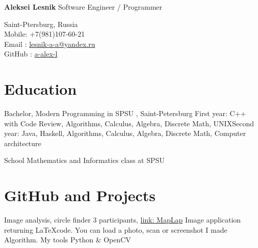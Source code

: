\documentclass[12pt,a4paper]{moderncv}
\begin{document}

	\begin{minipage} {0.7\textwidth}
		\begin{flushleft}
			\huge \textbf{Aleksei Lesnik} 
			\newline
			\textcolor[gray]{0.4} {
			    \indent Software Engineer / Programmer\\
			}
			\normalsize
		\end{flushleft}
	\end{minipage}
	\begin{minipage} {0.3\textwidth}
		\begin{flushright}
			\textcolor[gray]{0.4} {
				\indent Saint-Ptersburg, Russia\\
				\indent Mobile: +7(981)107-60-21  \\
				\indent Email : \textcolor{blue} {\href{mailto:lesnik-a-a@yandex.ru} {lesnik-a-a@yandex.ru}}\\ 
				\indent GitHub : \textcolor{blue} {\href{https://github.com/a-alex-l} {a-alex-l}}\\  	
			}
		\end{flushright}
	\end{minipage}

    \section{Education}
    
         {Bachelor, Modern Programming in SPSU} {}{} {\textcolor{blue} {}, Saint-Petersburg} {First year: C++ with Code Review, Algorithms, Calculus, Algebra, Discrete Math, UNIX\newline  Second year: Java, Haskell, Algorithms, Calculus, Algebra, Discrete Math, Computer architecture}
    
         {School} {}{} {Mathematics and Informatics class at SPSU} {}
        
    \section{GitHub and Projects}
        
         {Image analysis, circle finder} {3 participants, \textcolor{blue} {\href{https://github.com/a-alex-l/MapLap} {link: MapLap}}} {} {\newline Image application returning \LaTeX code. You can load a photo, scan or screenshot} {I made Algorithm. My tools \textcolor{Attention} {Python \& OpenCV} }
        
\end{document}

